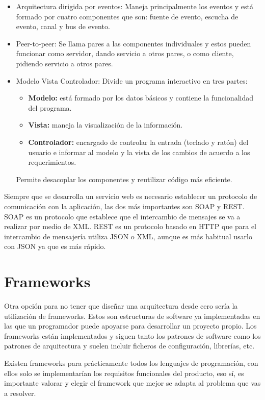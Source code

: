 \documentclass[12pt]{report} %
\begin{document}
\begin{itemize}
\begin{itemize}
 	\end{itemize}
 	\item Arquitectura dirigida por eventos: Maneja principalmente los eventos y está formado por cuatro componentes que son: fuente de evento, escucha de evento, canal y bus de evento.
 	\item Peer-to-peer: Se llama pares a las componentes individuales y estos pueden funcionar como servidor, dando servicio a otros pares, o como cliente, pidiendo servicio a otros pares.
 	\item Modelo Vista Controlador: Divide un programa interactivo en tres partes:
 		\begin{itemize}
 			\item \textbf{Modelo:} está formado por los datos básicos y contiene la funcionalidad del programa. 
 			\item \textbf{Vista:} maneja la visualización de la información. 
 			\item \textbf{Controlador:} encargado de controlar la entrada (teclado y ratón) del usuario e informar al modelo y la vista de los cambios de acuerdo a los requerimientos.
 		\end{itemize}
 	Permite desacoplar los componentes y reutilizar código más eficiente. 
 \end{itemize}

Siempre que se desarrolla un servicio web es necesario establecer un protocolo de comunicación con la aplicación, las dos más importantes son SOAP y REST. SOAP es un protocolo que establece que el intercambio de mensajes se va a realizar por medio de XML. REST es un protocolo basado en HTTP que para el intercambio de mensajería utiliza JSON o XML, aunque es más habitual usarlo con JSON ya que es más rápido.

\section{Frameworks}
 Otra opción para no tener que diseñar una arquitectura desde cero sería la utilización de frameworks. Estos son estructuras de software ya implementadas en las que un programador puede apoyarse para desarrollar un proyecto propio. Los frameworks están implementados y siguen tanto los patrones de software como los patrones de arquitectura y suelen incluir ficheros de configuración, librerías, etc.
 
 Existen frameworks para prácticamente todos los lenguajes de programación, con ellos solo se implementarían los requisitos funcionales del producto, eso sí, es importante valorar y elegir el framework que mejor se adapta al problema que vas a resolver.
 
\end{document}
